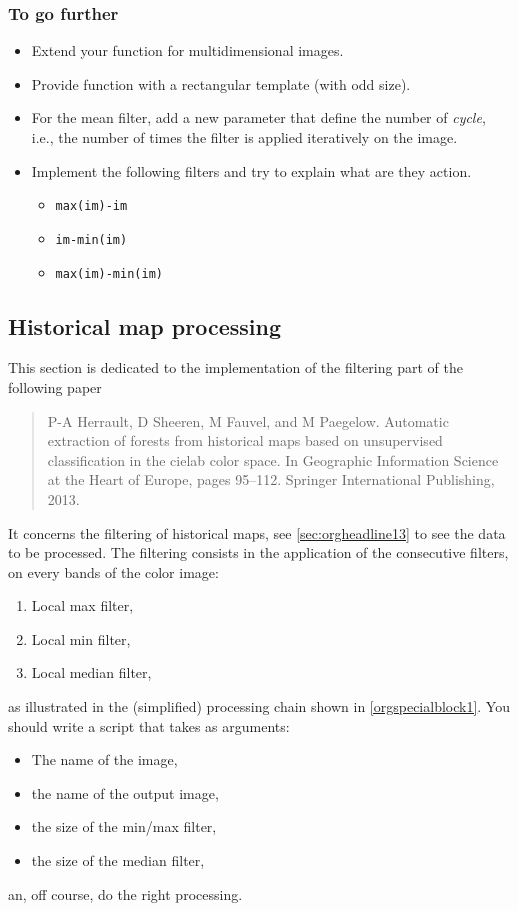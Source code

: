 \documentclass[a4paper,11pt,DIV=18]{scrartcl}
\begin{document}
\subsubsection{To go further}
\label{sec:orgheadline40}
\begin{itemize}
\item Extend your function for multidimensional images.
\item Provide function with a rectangular template (with odd size).
\item For the mean filter, add a new parameter that define the number of
\emph{cycle}, i.e., the number of times the filter is applied iteratively
on the image.
\item Implement the  following filters  and try to  explain what  are they
action.
\begin{itemize}
\item \texttt{max(im)-im}
\item \texttt{im-min(im)}
\item \texttt{max(im)-min(im)}
\end{itemize}
\end{itemize}
\subsection{Historical map processing}
\label{sec:orgheadline42}
This section is dedicated to the implementation of the filtering part of the following paper 
\begin{quote}
P-A  Herrault,  D  Sheeren,  M   Fauvel,  and  M  Paegelow.  Automatic
extraction  of  forests from  historical  maps  based on  unsupervised
classification in  the cielab  color space. In  Geographic Information
Science at the Heart of  Europe, pages 95--112. Springer International
Publishing, 2013.
\end{quote}

It concerns the filtering of  historical maps, see \ref{sec:orgheadline13} to see
the data to be processed. The filtering consists in the application of
the consecutive filters, on every bands of the color image:
\begin{enumerate}
\item Local max filter,
\item Local min filter,
\item Local median filter,
\end{enumerate}
as  illustrated   in  the  (simplified)  processing   chain  shown  in
\ref{orgspecialblock1}. You should write a script that takes as arguments:
\begin{itemize}
\item The name of the image,
\item the name of the output image,
\item the size of the min/max filter,
\item the size of the median filter,
\end{itemize}
an, off course, do the right processing.
\end{document}
